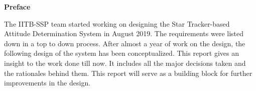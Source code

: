 \documentclass[../../main.tex]{subfiles}
\begin{document}
\newpage
\thispagestyle{plain}
\begin{center}
    \Large{\textbf{Preface}}
\end{center}


The IITB-SSP team started working on designing the Star Tracker-based Attitude Determination System in August 2019. The requirements were listed down in a top to down process. After almost a year of work on the design, the following design of the system has been conceptualized. This report gives an insight to the work done till now. It includes all the major decisions taken and the rationales behind them. This report will serve as a building block for further improvements in the design.


\end{document}
